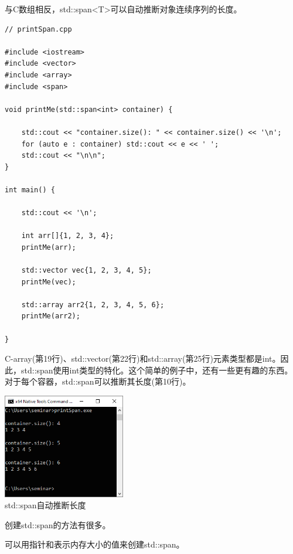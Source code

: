 与C数组相反，std::span<T>可以自动推断对象连续序列的长度。

\begin{lstlisting}[style=styleCXX]
// printSpan.cpp

#include <iostream>
#include <vector>
#include <array>
#include <span>

void printMe(std::span<int> container) {

	std::cout << "container.size(): " << container.size() << '\n';
	for (auto e : container) std::cout << e << ' ';
	std::cout << "\n\n";
}

int main() {

	std::cout << '\n';
	
	int arr[]{1, 2, 3, 4};
	printMe(arr);
	
	std::vector vec{1, 2, 3, 4, 5};
	printMe(vec);
	
	std::array arr2{1, 2, 3, 4, 5, 6};
	printMe(arr2);

}
\end{lstlisting}

C-array(第19行)、std::vector(第22行)和std::array(第25行)元素类型都是int。因此，std::span使用int类型的特化。这个简单的例子中，还有一些更有趣的东西。对于每个容器，std::span可以推断其长度(第10行)。

\begin{center}
\includegraphics[width=0.4\textwidth]{content/3/chapter5/images/5.png}\\
std::span自动推断长度
\end{center}

创建std::span的方法有很多。



可以用指针和表示内存大小的值来创建std::span。

